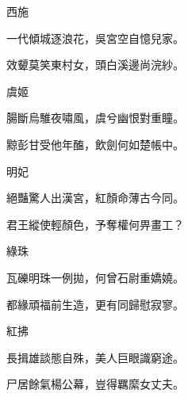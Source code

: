 \begin{poem}
    \begin{pl}西施\end{pl}


    \begin{pl}一代傾城逐浪花，吳宮空自憶兒家。\end{pl}


    \begin{pl}效顰莫笑東村女，頭白溪邊尚浣紗。\end{pl}
    \emptypl

    \begin{pl}虞姬\end{pl}


    \begin{pl}腸斷烏騅夜嘯風，虞兮幽恨對重瞳。\end{pl}


    \begin{pl}黥彭甘受他年醢，飲劍何如楚帳中。\end{pl}
    \emptypl

    \begin{pl}明妃\end{pl}


    \begin{pl}絕豔驚人出漢宮，紅顏命薄古今同。\end{pl}


    \begin{pl}君王縱使輕顏色，予奪權何畀畫工？\end{pl}
    \emptypl

    \begin{pl}綠珠\end{pl}


    \begin{pl}瓦礫明珠一例拋，何曾石尉重嬌嬈。\end{pl}


    \begin{pl}都緣頑福前生造，更有同歸慰寂寥。\end{pl}
    \emptypl

    \begin{pl}紅拂\end{pl}


    \begin{pl}長揖雄談態自殊，美人巨眼識窮途。\end{pl}


    \begin{pl}尸居餘氣楊公幕，豈得羈縻女丈夫。\end{pl}


\end{poem}


